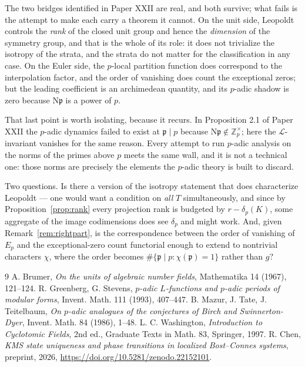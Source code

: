 \documentclass[11pt]{amsart}
\numberwithin{equation}{section}
\theoremstyle{definition}
\theoremstyle{remark}
\newcommand{\Z}{\mathbb{Z}}
\newcommand{\cL}{\mathcal{L}}
\newcommand{\pp}{\mathfrak{p}}
\newcommand{\Ns}{\mathrm{N}}
\begin{document}
The two bridges identified in Paper XXII are real, and both survive; what fails is the
attempt to make each carry a theorem it cannot. On the unit side, Leopoldt controls the
\emph{rank} of the closed unit group and hence the \emph{dimension} of the symmetry group,
and that is the whole of its role: it does not trivialize the isotropy of the strata, and the
strata do not matter for the classification in any case. On the Euler side, the $p$-local
partition function does correspond to the interpolation factor, and the order of vanishing
does count the exceptional zeros; but the leading coefficient is an archimedean quantity, and
its $p$-adic shadow is zero because $\Ns\pp$ is a power of $p$.

That last point is worth isolating, because it recurs. In Proposition 2.1 of Paper XXII the
$p$-adic dynamics failed to exist at $\pp\mid p$ because $\Ns\pp\notin\Z_p^\times$; here the
$\cL$-invariant vanishes for the same reason. Every attempt to run $p$-adic analysis on the
norms of the primes above $p$ meets the same wall, and it is not a technical one: those norms
are precisely the elements the $p$-adic theory is built to discard.

Two questions. Is there a version of the isotropy statement that does characterize Leopoldt
--- one would want a condition on \emph{all} $T$ simultaneously, and since by
Proposition~\ref{prop:rank} every projection rank is budgeted by $r-\delta_p(K)$, some
aggregate of the image codimensions does see $\delta_p$ and might work. And, given Remark~\ref{rem:rightpart}, is the correspondence
between the order of vanishing of $E_p$ and the exceptional-zero count functorial enough to
extend to nontrivial characters $\chi$, where the order becomes
$\#\{\pp\mid p:\chi(\pp)=1\}$ rather than $g$?

\begin{thebibliography}{9}
 A. Brumer, \emph{On the units of algebraic number fields}, Mathematika 14 (1967), 121--124.
 R. Greenberg, G. Stevens, \emph{$p$-adic $L$-functions and $p$-adic periods of modular forms}, Invent. Math. 111 (1993), 407--447.
 B. Mazur, J. Tate, J. Teitelbaum, \emph{On $p$-adic analogues of the conjectures of Birch and Swinnerton-Dyer}, Invent. Math. 84 (1986), 1--48.
 L. C. Washington, \emph{Introduction to Cyclotomic Fields}, 2nd ed., Graduate Texts in Math. 83, Springer, 1997.
 R. Chen, \emph{KMS state uniqueness and phase transitions in localized Bost--Connes systems}, preprint, 2026, \newline\url{https://doi.org/10.5281/zenodo.22152101}.
\end{thebibliography}
\end{document}

